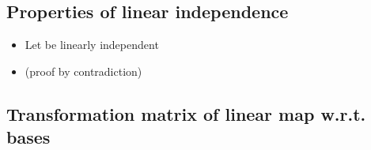 \subsection*{Properties of linear
independence}

\begin{itemize}

\item
  Let  be
  linearly independent
\item
   (proof by contradiction)
\end{itemize}

\subsection*{Transformation matrix of linear map w.r.t.
bases}

